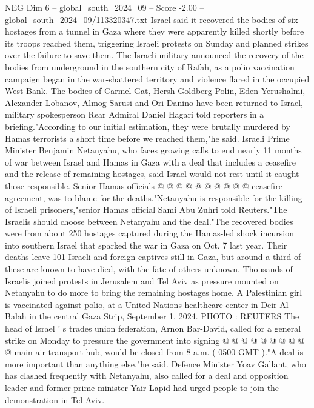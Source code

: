 \begin{textsample}{NEG Dim 6 – global\_south\_2024\_09 – Score -2.00 – global\_south\_2024\_09/113320347.txt}  \label{ex:f6_neg_032}
Israel said it recovered the bodies of six hostages from a tunnel in Gaza where they were apparently killed shortly before its troops reached them, triggering Israeli protests on Sunday and planned strikes over the failure to save them.
The Israeli military announced the recovery of the bodies from underground in the southern city of Rafah, as a polio vaccination campaign began in the war-shattered territory and violence flared in the occupied West Bank.
The bodies of Carmel Gat, Hersh Goldberg-Polin, Eden Yerushalmi, Alexander Lobanov, Almog Sarusi and Ori Danino have been returned to Israel, military spokesperson Rear Admiral Daniel Hagari told reporters in a briefing."According to our initial estimation, they were brutally murdered by Hamas terrorists a short time before we reached them,"he said.
Israeli Prime Minister Benjamin Netanyahu, who faces growing calls to end nearly 11 months of war between Israel and Hamas in Gaza with a deal that includes a ceasefire and the release of remaining hostages, said Israel would not rest until it caught those responsible.
Senior Hamas officials @ @ @ @ @ @ @ @ @ @ ceasefire agreement, was to blame for the deaths."Netanyahu is responsible for the killing of Israeli prisoners,"senior Hamas official Sami Abu Zuhri told Reuters."The Israelis should choose between Netanyahu and the deal."The recovered bodies were from about 250 hostages captured during the Hamas-led shock incursion into southern Israel that sparked the war in Gaza on Oct. 7 last year.
Their deaths leave 101 Israeli and foreign captives still in Gaza, but around a third of these are known to have died, with the fate of others unknown.
Thousands of Israelis joined protests in Jerusalem and Tel Aviv as pressure mounted on Netanyahu to do more to bring the remaining hostages home.
A Palestinian girl is vaccinated against polio, at a United Nations healthcare center in Deir Al-Balah in the central Gaza Strip, September 1, 2024.
PHOTO : REUTERS The head of Israel ' s trades union federation, Arnon Bar-David, called for a general strike on Monday to pressure the government into signing @ @ @ @ @ @ @ @ @ @ main air transport hub, would be closed from 8 a.m. ( 0500 GMT )."A deal is more important than anything else,"he said.
Defence Minister Yoav Gallant, who has clashed frequently with Netanyahu, also called for a deal and opposition leader and former prime minister Yair Lapid had urged people to join the demonstration in Tel Aviv.

\end{textsample}
